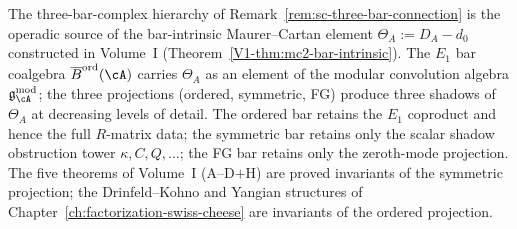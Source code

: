 \begin{remark}
\label{rem:sc-bar-intrinsic-connection}%
%
%
The three-bar-complex hierarchy of
Remark~\ref{rem:sc-three-bar-connection} is the operadic
source of the bar-intrinsic Maurer--Cartan element
$\Theta_A := D_A - d_0$ constructed in Volume~I
(Theorem~\ref*{V1-thm:mc2-bar-intrinsic}). The $E_1$ bar
coalgebra $\barB^{\mathrm{ord}}(\cA)$ carries
$\Theta_A$ as an element of the modular convolution algebra
$\mathfrak{g}^{\mathrm{mod}}_\cA$; the three projections
(ordered, symmetric, FG) produce three shadows of $\Theta_A$
at decreasing levels of detail. The ordered bar retains the
$E_1$ coproduct and hence the full $R$-matrix data; the
symmetric bar retains only the scalar shadow obstruction tower
$\kappa, C, Q, \ldots$; the FG bar retains only the
zeroth-mode projection. The five theorems of Volume~I
(A--D$+$H) are proved invariants of the symmetric projection;
the Drinfeld--Kohno and Yangian structures of
Chapter~\ref{ch:factorization-swiss-cheese} are invariants
of the ordered projection.
\end{remark}

